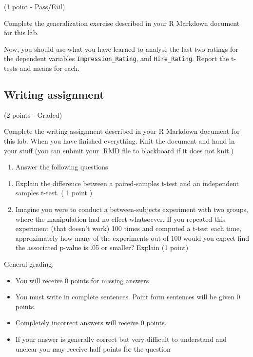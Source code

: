 \documentclass[
]{book}
\providecommand{\tightlist}{%
  \setlength{\itemsep}{0pt}\setlength{\parskip}{0pt}}
\begin{document}
(1 point - Pass/Fail)

Complete the generalization exercise described in your R Markdown document for this lab.

Now, you should use what you have learned to analyse the last two ratings for the dependent variables \texttt{Impression\_Rating}, and \texttt{Hire\_Rating}. Report the t-tests and means for each.

\hypertarget{writing-assignment-6}{%
\subsection{Writing assignment}\label{writing-assignment-6}}

(2 points - Graded)

Complete the writing assignment described in your R Markdown document for this lab. When you have finished everything. Knit the document and hand in your stuff (you can submit your .RMD file to blackboard if it does not knit.)

\begin{enumerate}
\def\labelenumi{\arabic{enumi}.}
\tightlist
\item
  Answer the following questions
\end{enumerate}

\begin{enumerate}
\def\labelenumi{\alph{enumi}.}
\item
  Explain the difference between a paired-samples t-test and an independent samples t-test. ( 1 point )
\item
  Imagine you were to conduct a between-subjects experiment with two groups, where the manipulation had no effect whatsoever. If you repeated this experiment (that doesn't work) 100 times and computed a t-test each time, approximately how many of the experiments out of 100 would you expect find the associated p-value is .05 or smaller? Explain (1 point)
\end{enumerate}

General grading.

\begin{itemize}
\tightlist
\item
  You will receive 0 points for missing answers
\item
  You must write in complete sentences. Point form sentences will be given 0 points.
\item
  Completely incorrect answers will receive 0 points.
\item
  If your answer is generally correct but very difficult to understand and unclear you may receive half points for the question
\end{itemize}
\end{document}
